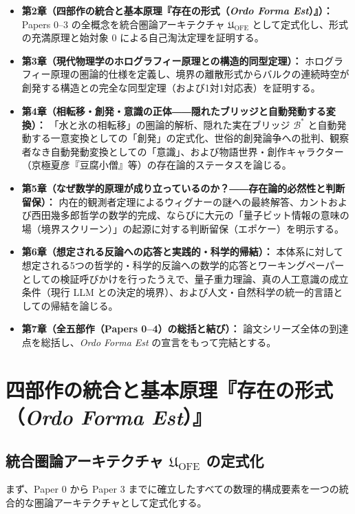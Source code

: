 \documentclass[11pt,a4paper]{ltjsarticle}
\theoremstyle{definition}
\theoremstyle{plain}
\begin{document}
\begin{itemize}
    \item \textbf{第2章（四部作の統合と基本原理『存在の形式（\textit{Ordo Forma Est}）』）：} Papers 0--3 \cite{Ota2026_0,Ota2026_1,Ota2026_2,Ota2026_3} の全概念を統合圏論アーキテクチャ $\mathfrak{U}_{\mathrm{OFE}}$ として定式化し、形式の充満原理と始対象 $0$ による自己淘汰定理を証明する。
    \item \textbf{第3章（現代物理学のホログラフィー原理との構造的同型定理）：} ホログラフィー原理の圏論的仕様を定義し、境界の離散形式からバルクの連続時空が創発する構造との完全な同型定理（および1対1対応表）を証明する。
    \item \textbf{第4章（相転移・創発・意識の正体――隠れたブリッジと自動発動する変換）：} 「水と氷の相転移」の圏論的解析、隠れた実在ブリッジ $\mathcal{B}^*$ と自動発動する一意変換としての「創発」の定式化、世俗的創発論争への批判、観察者なき自動発動変換としての「意識」、および物語世界・創作キャラクター（京極夏彦『豆腐小僧』等）の存在論的ステータスを論じる。
    \item \textbf{第5章（なぜ数学的原理が成り立っているのか？――存在論的必然性と判断留保）：} 内在的観測者定理によるウィグナーの謎への最終解答、カントおよび西田幾多郎哲学の数学的完成、ならびに大元の「量子ビット情報の意味の場（境界スクリーン）」の起源に対する判断留保（エポケー）を明示する。
    \item \textbf{第6章（想定される反論への応答と実践的・科学的帰結）：} 本体系に対して想定される5つの哲学的・科学的反論への数学的応答とワーキングペーパーとしての検証呼びかけを行ったうえで、量子重力理論、真の人工意識の成立条件（現行 LLM との決定的境界）、および人文・自然科学の統一的言語としての帰結を論じる。
    \item \textbf{第7章（全五部作（Papers 0--4）の総括と結び）：} 論文シリーズ全体の到達点を総括し、\textit{Ordo Forma Est} の宣言をもって完結とする。
\end{itemize}

\section{四部作の統合と基本原理『存在の形式（\textit{Ordo Forma Est}）』}

\subsection{統合圏論アーキテクチャ $\mathfrak{U}_{\mathrm{OFE}}$ の定式化}
まず、Paper 0 \cite{Ota2026_0} から Paper 3 \cite{Ota2026_3} までに確立したすべての数理的構成要素を一つの統合的な圏論アーキテクチャとして定式化する。
\end{document}

